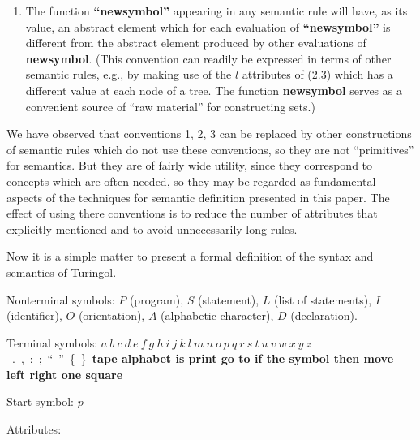 \documentclass[a4paper]{article}
\begin{document}
\begin{enumerate}
\item The function {\bfseries ``newsymbol''} appearing in any semantic rule
will have, as its value, an abstract element which for each evaluation of
{\bfseries ``newsymbol''} is different from the abstract element produced by
other evaluations of {\bfseries newsymbol}. (This convention can readily be
expressed in terms of other semantic rules, e.g., by making use of the $l$
attributes of (2.3) which has a different value at each node of a tree. The
function {\bfseries newsymbol} serves as a convenient source of ``raw
material'' for constructing sets.)

\end{enumerate}

We have observed that conventions 1, 2, 3 can be replaced by other constructions
of semantic rules which do not use these conventions, so they are not
``primitives'' for semantics. But they are of fairly wide utility, since they
correspond to concepts which are often needed, so they may be regarded as
fundamental aspects of the techniques for semantic definition presented in this
paper. The effect of using there conventions is to reduce the number of
attributes that explicitly mentioned and to avoid unnecessarily long rules.

Now it is a simple matter to present a formal definition of the syntax and
semantics of Turingol.

Nonterminal symbols: $P$ (program), $S$ (statement), $L$ (list of statements),
	$I$ (identifier), $O$ (orientation), $A$ (alphabetic character), $D$
	(declaration).

Terminal symbols: $a\ b\ c\ d\ e\ f\ g\ h\ i\ j\ k\ l\ m\ n\ o\ p\ q\ r\ s\ t\
	u\ v\ w\ x\ y\ z$\ .\ ,\ :\ ;\ ``\ ''\ \{\ \}\ {\bfseries tape alphabet is
	print go to if the symbol then move left right one square}

Start symbol: $p$

Attributes:
\end{document}
